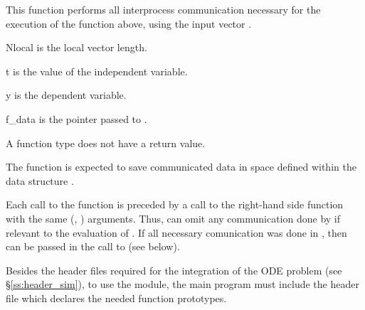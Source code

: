{
  This function performs all interprocess communication necessary 
  for the execution of the  function above, using the input vector .
}
{
  \begin{args}[Nlocal]
  \item[Nlocal] 
    is the local vector length.
  \item[t]
    is the value of the independent variable.
  \item[y]
    is the dependent variable. 
  \item[f\_data]
    is the       
    pointer passed to .  
  \end{args}
}
{
  A  function type does not have a return value.
}
{
  The  function is expected to save communicated data in space defined
  within the data structure . 

  Each call to the  function is preceded by a call to the right-hand side
  function  with the same (, ) arguments.  Thus,  can omit 
  any communication done by  if relevant to the evaluation of .  
If all necessary comunication was done in , then 
  can be passed in the call to  (see below).
}

Besides the header files required for the integration of the ODE problem
(see \S\ref{ss:header_sim}),  to use the {\cvbbdpre} module, the main program 
must include the header file  which declares the needed
function prototypes.

